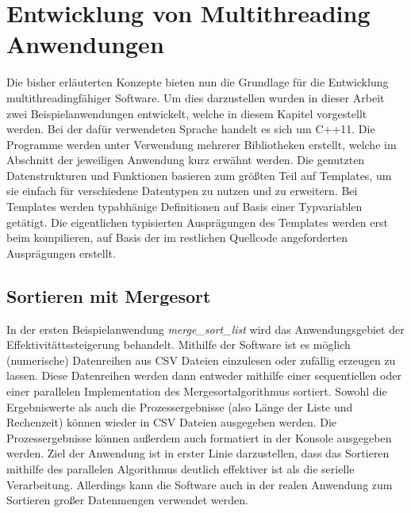 \chapter{Entwicklung von Multithreading Anwendungen}
Die bisher erläuterten Konzepte bieten nun die Grundlage für die Entwicklung multithreadingfähiger Software. Um dies darzustellen wurden in dieser Arbeit zwei Beispielanwendungen entwickelt, welche in diesem Kapitel vorgestellt werden. Bei der dafür verwendeten Sprache handelt es sich um C++11. Die Programme werden unter Verwendung mehrerer Bibliotheken erstellt, welche im Abschnitt der jeweiligen Anwendung kurz erwähnt werden. Die genutzten Datenstrukturen und Funktionen basieren zum größten Teil auf Templates, um sie einfach für verschiedene Datentypen zu nutzen und zu erweitern. Bei Templates werden typabhänige Definitionen auf Basis einer Typvariablen getätigt. Die eigentlichen typisierten Ausprägungen des Templates werden erst beim kompilieren, auf Basis der im restlichen Quellcode angeforderten Ausprägungen erstellt.

\section{Sortieren mit Mergesort}
In der ersten Beispielanwendung \textit{merge\_sort\_list} wird das Anwendungsgebiet der Effektivitättssteigerung behandelt. Mithilfe der Software ist es möglich (numerische) Datenreihen aus \ac{CSV} Dateien einzulesen oder zufällig erzeugen zu lassen. Diese Datenreihen werden dann entweder mithilfe einer sequentiellen oder einer parallelen Implementation des Mergesortalgorithmus sortiert. Sowohl die Ergebniswerte als auch die Prozessergebnisse (also Länge der Liste und Rechenzeit) können wieder in \ac{CSV} Dateien ausgegeben werden. Die Prozessergebnisse können außerdem auch formatiert in der Konsole ausgegeben werden. Ziel der Anwendung ist in erster Linie darzustellen, dass das Sortieren mithilfe des parallelen Algorithmus deutlich effektiver ist als die serielle Verarbeitung. Allerdings kann die Software auch in der realen Anwendung zum Sortieren großer Datenmengen verwendet werden.

